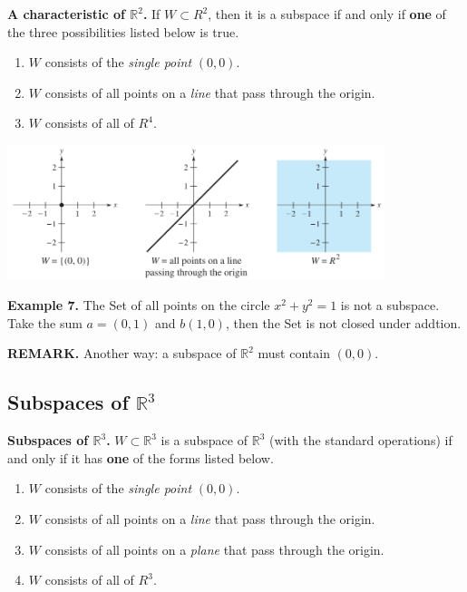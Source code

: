 \documentclass{article}
\newcommand\B{\textbf}
\newcommand\tcl{\begin{tcolorbox}[colback = {blue9}]}
\newcommand\etcl{\end{tcolorbox}}
\begin{document}
\begin{tcolorbox}
    \tcl
    \B{A characteristic of $\mathbb{R}^2$.} \quad If $W \subset R^2$, then it is a subspace if and only if
    \B{one} of the three possibilities listed below is true.
    \begin{enumerate}
        \item $W$ consists of the \textit{single point} $(0,0)$.
        \item $W$ consists of all points on a \textit{line} that pass through the origin.
        \item $W$ consists of all of $R^4$.
    \end{enumerate}
    \etcl 
    \begin{center}
        \includegraphics[width = 11cm]{images/3r2.png}
    \end{center}
    \B{Example 7.} The Set of all points on the circle $x^2 + y^2 = 1$ is not a subspace.\\
    \quad Take the sum $a = (0,1)$ and $b(1,0)$, then the Set is not closed under addtion.

    \B{REMARK. } Another way: a subspace of $\mathbb{R}^2$ must contain $(0,0)$.

    \subsection{Subspaces of $\mathbb{R}^3$}

    \tcl
    \B{Subspaces of $\mathbb{R}^3$. } $W \subset \mathbb{R}^3$ is a subspace of $\mathbb{R}^3$ (with the standard operations) if
    and only if it has \B{one} of the forms listed below.
    \begin{enumerate}
        \item $W$ consists of the \textit{single point} $(0,0)$.
        \item $W$ consists of all points on a \textit{line} that pass through the origin.
        \item $W$ consists of all points on a \textit{plane} that pass through the origin.
        \item $W$ consists of all of $R^3$.
    \end{enumerate}
    \etcl 


\end{tcolorbox}
\end{document}
